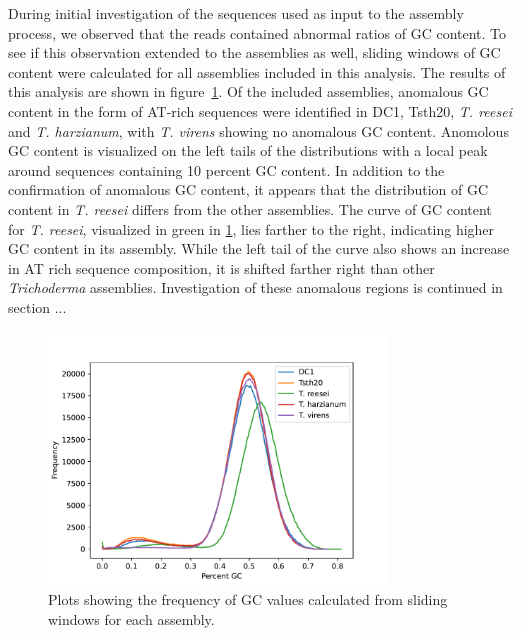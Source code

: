 During initial investigation of the sequences used as input to the
assembly process, we observed that the reads contained abnormal ratios
of GC content. To see if this observation extended to the assemblies
as well, sliding windows of GC content were calculated for all
assemblies included in this analysis. The results of this analysis are
shown in figure~\ref{fig:assembly-gc}. Of the included assemblies,
anomalous GC content in the form of AT-rich sequences were identified
in DC1, Tsth20, \textit{T. reesei} and \textit{T. harzianum}, with
\textit{T. virens} showing no anomalous GC content. Anomolous GC
content is visualized on the left tails of the distributions with a
local peak around sequences containing 10 percent GC content. In
addition to the confirmation of anomalous GC content, it appears that
the distribution of GC content in \textit{T. reesei} differs from the
other assemblies. The curve of GC content for \textit{T. reesei},
visualized in green in \ref{fig:assembly-gc}, lies farther to the
right, indicating higher GC content in its assembly. While the left
tail of the curve also shows an increase in AT rich sequence
composition, it is shifted farther right than other
\textit{Trichoderma} assemblies. Investigation of these anomalous
regions is continued in section ...

\begin{figure}
  \begin{center}
    \includegraphics[width=0.8\textwidth]{figures/gc-plot.pdf}
  \end{center}
  \caption{Plots showing the frequency of GC values calculated from
    sliding windows for each assembly.}
  \label{fig:assembly-gc}
\end{figure}


